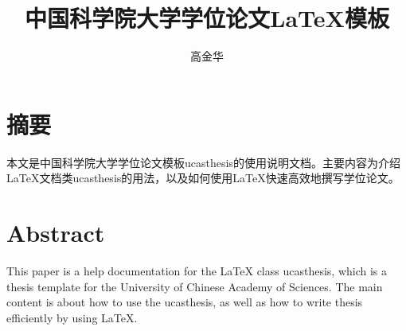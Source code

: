   \confidential{}%
  \title[国科大学位论文\LaTeX{}模板]{中国科学院大学学位论文\LaTeX{}模板}%
  \author{高金华}%
\maketitle
\makeenglishtitle
\makedeclaration
\chapter{摘\quad 要}%
本文是中国科学院大学学位论文模板ucasthesis的使用说明文档。主要内容为介绍\LaTeX{}文档类ucasthesis的用法，以及如何使用\LaTeX{}快速高效地撰写学位论文。



\chapter{Abstract}%
This paper is a help documentation for the \LaTeX{} class ucasthesis, which is  a thesis template for the University of Chinese Academy of Sciences. The main content is about how to use the ucasthesis, as well as how to write thesis efficiently by using \LaTeX{}.

